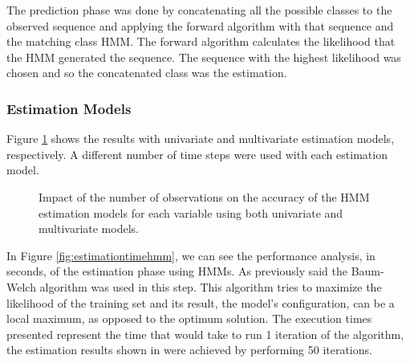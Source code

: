 The prediction phase was done by concatenating all the possible classes to the observed sequence and applying the forward
 algorithm with that sequence and the matching class HMM. The forward algorithm calculates the likelihood that the HMM 
 generated the sequence. The sequence with the highest likelihood was chosen and so the concatenated class was the estimation.

\subsubsection{Estimation Models}
\label{subsubsection:estimation_hmm}

Figure \ref{fig:estimationhmm} shows the results with univariate and multivariate estimation models,
 respectively. A different number of time steps were used with each estimation model.
 
 \begin{figure}[h]
  \begin{subfigmatrix}{2}
  \end{subfigmatrix}
  \caption{Impact of the number of observations on the accuracy of the HMM estimation models for each variable using both univariate and multivariate models.}
  \label{fig:estimationhmm}
\end{figure}
 
 In Figure \ref{fig:estimationtimehmm}, we can see the performance analysis, in seconds, of the estimation phase using HMMs. As previously said the Baum-Welch algorithm was used in this step. This algorithm tries to maximize the likelihood of the training set and its result, the model's configuration, can be a local maximum, as opposed to the optimum solution. The execution times presented represent the time that would take to run 1 iteration of the algorithm, the estimation results shown in were achieved by performing 50 iterations.

